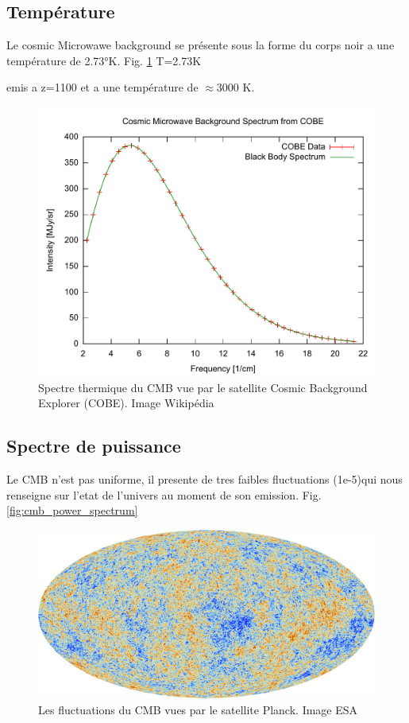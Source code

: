 \subsection{Température}
Le cosmic Microwawe background se présente sous la forme du corps noir a une température de 2.73°K.
Fig. \ref{fig:cmb_thermal_spectrum}
T=2.73K

emis a z=1100 et a une température de $\approx 3000$ K.



\begin{figure}[htbp]
        \includegraphics[width=.95\linewidth]{img/01/Cmbr.pdf} 
        \caption{Spectre thermique du CMB vue par le satellite Cosmic Background Explorer (COBE). 
        Image Wikipédia}
 		\label{fig:cmb_thermal_spectrum}
\end{figure}




\subsection{Spectre de puissance}

Le CMB n'est pas uniforme, il presente de tres faibles fluctuations (1e-5)qui nous renseigne sur l'etat de l'univers au moment de son emission.
Fig. \ref{fig:cmb_power_spectrum}

\begin{figure}[htbp]
        \includegraphics[width=.95\linewidth]{img/01/CMB.jpeg} 
        \caption{Les fluctuations du CMB vues par le satellite Planck. 
        Image ESA}
 		\label{fig:cmb}
\end{figure}


